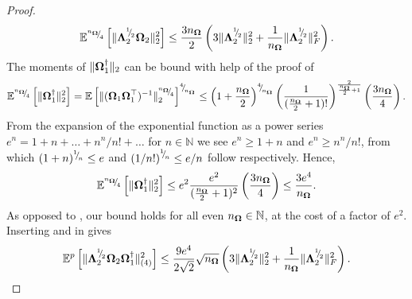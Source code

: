 \documentclass[12pt]{article}
\begin{document}
\begin{proof}
    \begin{equation}
        \mathbb{E}^{{}^{n_{\boldsymbol{\Omega}}}{\mskip -5mu/\mskip -3mu}_{4}}\left[ \lVert \boldsymbol{\Lambda}_2^{{}^{1}{\mskip -5mu/\mskip -3mu}_{2}} \boldsymbol{\Omega}_2 \rVert _2^2 \right]
        \leq \frac{3 n_{\boldsymbol{\Omega}}}{2} \left( 3 \lVert \boldsymbol{\Lambda}_2^{{}^{1}{\mskip -5mu/\mskip -3mu}_{2}} \rVert _2^2 + \frac{1}{n_{\boldsymbol{\Omega}}} \lVert \boldsymbol{\Lambda}_2^{{}^{1}{\mskip -5mu/\mskip -3mu}_{2}} \rVert _F^2 \right).
        \label{equ:spectral-norm-bound-applied}
    \end{equation}
    The moments of $\lVert \boldsymbol{\Omega}_1^{\dagger} \rVert _2$ can be bound with help of the proof of \cite[lemma B.3]{tropp-2023-randomized-algorithms}
    \begin{equation}
        \mathbb{E}^{\sfrac{n_{\mtx{\Omega}}}{4}}\left[ \lVert \mtx{\Omega}_1^{\dagger} \rVert _2^2 \right]
        = \mathbb{E}\left[ \lVert ( \mtx{\Omega}_1 \mtx{\Omega}_1^{\top} )^{-1} \rVert _2^{\sfrac{n_{\mtx{\Omega}}}{4}} \right]^{\sfrac{4}{n_{\mtx{\Omega}}}}%
        \leq \left( 1 + \frac{n_{\mtx{\Omega}}}{2} \right)^{\sfrac{4}{n_{\mtx{\Omega}}}} \left( \frac{1}{(\frac{n_{\mtx{\Omega}}}{2} + 1)!}\right)^{\frac{2}{\frac{n_{\mtx{\Omega}}}{2} + 1}} \left( \frac{3 n_{\mtx{\Omega}}}{4}\right).
    \end{equation}
    From the expansion of the exponential function as a power series $e^n = 1 + n + \dots + n^n/n! + \dots$ for $n \in \mathbb{N}$ we see $e^n \geq 1 + n$ and $e^n \geq n^n / n!$, from which $(1 + n)^{{}^{1}{\mskip -5mu/\mskip -3mu}_{n}} \leq e$ and $\left( 1/n! \right)^{{}^{1}{\mskip -5mu/\mskip -3mu}_{n}} \leq e/n$ follow respectively. Hence,
    \begin{equation}
        \mathbb{E}^{{}^{n_{\boldsymbol{\Omega}}}{\mskip -5mu/\mskip -3mu}_{4}}\left[ \lVert \boldsymbol{\Omega}_1^{\dagger} \rVert _2^2 \right]
        \leq e^2 \frac{e^2}{(\frac{n_{\boldsymbol{\Omega}}}{2}+ 1)^2} \left( \frac{3 n_{\boldsymbol{\Omega}}}{4}\right)
        \leq \frac{3 e^4}{n_{\boldsymbol{\Omega}}}.
        \label{equ:pinv-spectral-norm-bound}
    \end{equation}
    As opposed to \cite[lemma B.3]{tropp-2023-randomized-algorithms}, our bound holds for all even $n_{\boldsymbol{\Omega}} \in \mathbb{N}$, at the cost of a factor of $e^2$. Inserting  and   in  gives
    \begin{equation}
        \mathbb{E}^{p}\left[ \lVert \mtx{\Lambda}_2^{\sfrac{1}{2}} \mtx{\Omega}_2 \mtx{\Omega}_1^{\dagger} \rVert _{(4)}^2 \right]
        \leq \frac{9 e^4}{2 \sqrt{2}}  \sqrt{n_{\mtx{\Omega}}} \left( 3 \lVert \mtx{\Lambda}_2^{\sfrac{1}{2}} \rVert _2^2 + \frac{1}{n_{\mtx{\Omega}}} \lVert \mtx{\Lambda}_2^{\sfrac{1}{2}} \rVert _F^2 \right).

\end{equation}
\end{proof}
\end{document}

